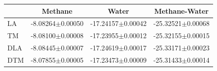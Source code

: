 \begin{tabular}{|l c c c|}
\toprule
 & Methane & Water & Methane-Water \\
\midrule
LA & -8.08264$\pm$0.00050 & -17.24157$\pm$0.00042 & -25.32521$\pm$0.00068 \\
TM & -8.08100$\pm$0.00008 & -17.23955$\pm$0.00012 & -25.32155$\pm$0.00015 \\
DLA & -8.08445$\pm$0.00007 & -17.24619$\pm$0.00017 & -25.33171$\pm$0.00023 \\
DTM & -8.07855$\pm$0.00005 & -17.23473$\pm$0.00009 & -25.31433$\pm$0.00014 \\
\bottomrule
\end{tabular}
